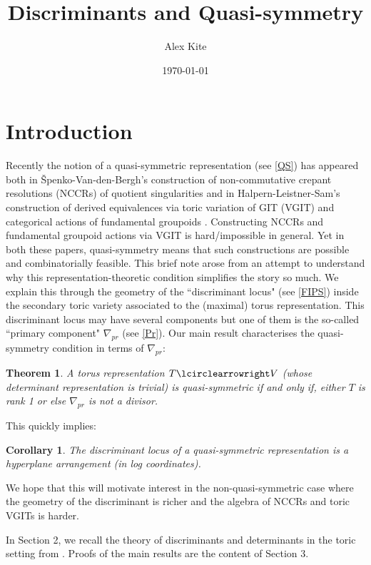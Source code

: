 \documentclass[a4paper]{article}
\title{Discriminants and Quasi-symmetry}
\author{Alex Kite}
\date{\today}
\theoremstyle{plain}
\newtheorem*{thm*}{Theorem}
\newtheorem*{cor*}{Corollary}
\theoremstyle{definition}
\theoremstyle{remark}
\begin{document}
\maketitle

\section{Introduction}

Recently the notion of a quasi-symmetric representation (see \ref{QS}) has appeared both in \v{S}penko-Van-den-Bergh's construction of non-commutative crepant resolutions (NCCRs) of quotient singularities \cite{SV} and in Halpern-Leistner-Sam's construction of derived equivalences via toric variation of GIT (VGIT) and categorical actions of fundamental groupoids \cite{HLS}. Constructing NCCRs and fundamental groupoid actions via VGIT is hard/impossible in general. Yet in both these papers, quasi-symmetry means that such constructions are possible and combinatorially feasible. This brief note arose from an attempt to understand why this representation-theoretic condition simplifies the story so much. We explain this through the geometry of the ``discriminant locus" (see \ref{FIPS}) inside the secondary toric variety associated to the (maximal) torus representation. This discriminant locus may have several components but one of them is the so-called ``primary component" $\nabla_{pr}$ (see \ref{Pr}). Our main result characterises the quasi-symmetry condition in terms of $\nabla_{pr}$:

\begin{thm*}
A torus representation $T \lcirclearrowright V$ (whose determinant representation is trivial) is quasi-symmetric if and only if, either $T$ is rank 1 or else $\nabla_{pr}$ is not a divisor.
\end{thm*}

This quickly implies:

\begin{cor*}
The discriminant locus of a quasi-symmetric representation is a hyperplane arrangement (in log coordinates).
\end{cor*}
 
We hope that this will motivate interest in the non-quasi-symmetric case where the geometry of the discriminant is richer and the algebra of NCCRs and toric VGITs is harder.

In Section 2, we recall the theory of discriminants and determinants in the toric setting from \cite{GKZ}. Proofs of the main results are the content of Section 3.
\end{document}
